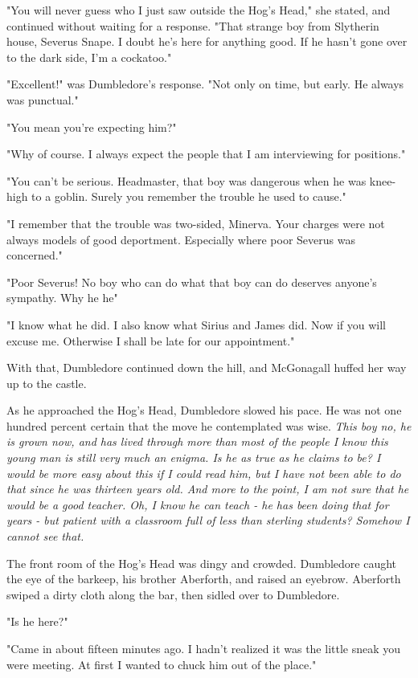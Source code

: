 "You will never guess who I just saw outside the Hog's Head," she stated, and continued without waiting for a response. "That strange boy from Slytherin house, Severus Snape. I doubt he's here for anything good. If he hasn't gone over to the dark side, I'm a cockatoo."

"Excellent!" was Dumbledore's response. "Not only on time, but early. He always was punctual."

"You mean you're expecting him?"

"Why of course. I always expect the people that I am interviewing for positions."

"You can't be serious. Headmaster, that boy was dangerous when he was knee-high to a goblin. Surely you remember the trouble he used to cause."

"I remember that the trouble was two-sided, Minerva. Your charges were not always models of good deportment. Especially where poor Severus was concerned."

"Poor Severus! No boy who can do what that boy can do deserves anyone's sympathy. Why he{\el} he{\el}"

"I know what he did. I also know what Sirius and James did. Now if you will excuse me. Otherwise I shall be late for our appointment."

With that, Dumbledore continued down the hill, and McGonagall huffed her way up to the castle.

As he approached the Hog's Head, Dumbledore slowed his pace. He was not one hundred percent certain that the move he contemplated was wise. \emph{This boy{\el} no, he is grown now, and has lived through more than most of the people I know{\el} this young man is still very much an enigma. Is he as true as he claims to be? I would be more easy about this if I could read him, but I have not been able to do that since he was thirteen years old. And more to the point, I am not sure that he would be a good teacher. Oh, I know he can teach - he has been doing that for years - but patient with a classroom full of less than sterling students{\el}? Somehow I cannot see that.}

The front room of the Hog's Head was dingy and crowded. Dumbledore caught the eye of the barkeep, his brother Aberforth, and raised an eyebrow. Aberforth swiped a dirty cloth along the bar, then sidled over to Dumbledore.

"Is he here?"

"Came in about fifteen minutes ago. I hadn't realized it was the little sneak you were meeting. At first I wanted to chuck him out of the place."


